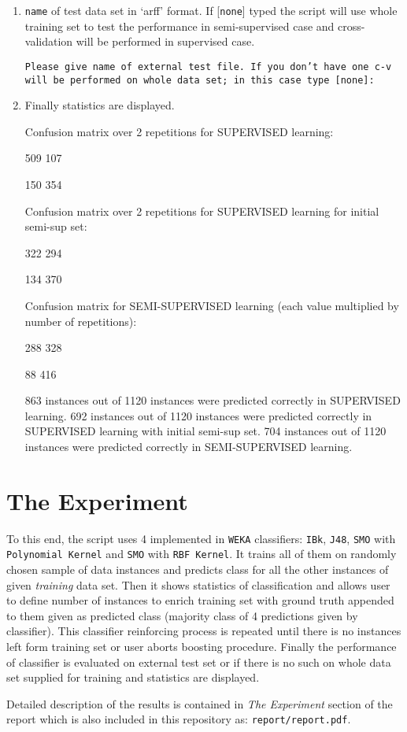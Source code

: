 \begin{enumerate}
\item \texttt{name} of test data set in `arff' format. If [\texttt{none}] typed the script will use whole training set to test the performance in semi-supervised case and cross-validation will be performed in supervised case.

\texttt{Please give name of external test file. If you don't have one c-v will be performed on whole data set; in this case  type [none]:}

\item Finally statistics are displayed.

\begin{spverbatim}
Confusion matrix over 2 repetitions for SUPERVISED learning:

    509 107

    150 354

Confusion matrix over 2 repetitions for SUPERVISED learning for initial semi-sup set:


    322 294

    134  370

Confusion matrix for SEMI-SUPERVISED learning (each value multiplied  by number of repetitions):

    288 328

    88  416

863 instances out of 1120 instances were predicted correctly in SUPERVISED learning.
692 instances out of 1120 instances were predicted correctly in SUPERVISED learning with initial semi-sup set.
704 instances out of 1120 instances were predicted correctly in SEMI-SUPERVISED learning.
\end{spverbatim}

\end{enumerate}

\section*{The Experiment}

To this end, the script uses 4 implemented in \texttt{WEKA} classifiers: \texttt{IBk}, \texttt{J48}, \texttt{SMO} with \texttt{Polynomial Kernel} and \texttt{SMO} with \texttt{RBF Kernel}. It trains all of them on randomly chosen sample of data instances and predicts class for all the other instances of given \emph{training} data set. Then it shows statistics of classification and allows user to define number of instances to enrich training set with ground truth appended to them given as predicted class (majority class of 4 predictions given by classifier). This classifier reinforcing process is repeated until there is no instances left form training set or user aborts boosting procedure. Finally the performance of classifier is evaluated on external test set or if there is no such on whole data set supplied for training and statistics are displayed.

Detailed description of the results is contained in \emph{The Experiment} section of the report which is also included in this repository as: \texttt{report\slash report.pdf}.
